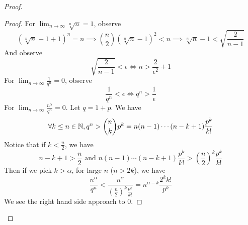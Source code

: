 \documentclass{report}
\begin{document}
\begin{proof}
\begin{proof}
For $\lim_{n\to\infty}\sqrt[n]{n} =1$, observe
\begin{equation}
 (\sqrt[n]{n}-1+1)^n=n\implies \binom{n}{2} (\sqrt[n]{n}-1)^2<n\implies \sqrt[n]{n}-1<\sqrt{\frac{2}{n-1}}  
\end{equation}
And observe
\begin{equation}
\sqrt{\frac{2}{n-1}}<\epsilon  \iff n>\frac{2}{\epsilon^2}+1  
\end{equation}
For $\lim_{n\to\infty}\frac{1}{q^n}=0$, observe
\begin{equation}
\frac{1}{q^n}<\epsilon  \iff  q^n>\frac{1}{\epsilon }
\end{equation}
For $\lim_{n\to\infty}\frac{n^\alpha }{q^n}=0$. Let $q=1+p$. We have
 \begin{equation}
\forall k\leq n\in\mathbb{N}, q^n>\binom{n}{k}p^k=n(n-1)\cdots (n-k+1) \frac{p^k}{k!}
\end{equation}
Notice that if $k<\frac{n}{2}$, we have
 \begin{equation}
n-k+1>\frac{n}{2}\text{ and }n(n-1)\cdots (n-k+1) \frac{p^k}{k!}>(\frac{n}{2})^k \frac{p^k}{k!}
\end{equation}
Then if we pick $k>\alpha $, for large  $n$  ($n>2k$), we have 
\begin{equation}
\frac{n^{\alpha }}{q^n}<\frac{n^{\alpha }}{(\frac{n}{2})^k \frac{p^k}{k!}}=n^{\alpha -k}\frac{2^kk!}{p^k}
\end{equation}
We see the right hand side approach to $0$.
\end{proof}

\end{proof}
\end{document}
